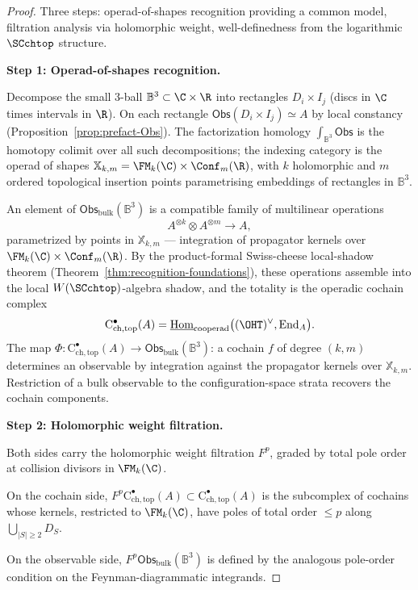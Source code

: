 \begin{proof}
Three steps: operad-of-shapes recognition providing a common model, filtration analysis via holomorphic weight, well-definedness from the logarithmic $\SCchtop$ structure.

\medskip
\textbf{Step 1: Operad-of-shapes recognition.}

Decompose the small $3$-ball $\mathbb{B}^3 \subset \C \times \R$ into rectangles $D_i \times I_j$ (discs in $\C$ times intervals in $\R$). On each rectangle $\mathsf{Obs}(D_i \times I_j) \simeq A$ by local constancy (Proposition~\ref{prop:prefact-Obs}). The factorization homology $\int_{\mathbb{B}^3} \mathsf{Obs}$ is the homotopy colimit over all such decompositions; the indexing category is the operad of shapes $\mathbb{X}_{k,m} = \FM_k(\C) \times \Conf_m(\R)$, with $k$ holomorphic and $m$ ordered topological insertion points parametrising embeddings of rectangles in $\mathbb{B}^3$.

An element of $\mathsf{Obs}_{\mathrm{bulk}}(\mathbb{B}^3)$ is a compatible family of multilinear operations
\[
A^{\otimes k} \otimes A^{\otimes m} \longrightarrow A,
\]
parametrized by points in $\mathbb{X}_{k,m}$ — integration of propagator kernels over $\FM_k(\C) \times \Conf_m(\R)$. By the product-formal Swiss-cheese local-shadow theorem (Theorem~\ref{thm:recognition-foundations}), these operations assemble into the local $W(\SCchtop)$-algebra shadow, and the totality is the operadic cochain complex
\[
\mathrm{C}^\bullet_{\mathrm{ch,top}}(A) = \underline{\mathrm{Hom}}_{\text{cooperad}}\bigl((\OHT)^\vee, \mathrm{End}_A\bigr).
\]
The map $\Phi \colon \mathrm{C}^\bullet_{\mathrm{ch,top}}(A) \to \mathsf{Obs}_{\mathrm{bulk}}(\mathbb{B}^3)$: a cochain $f$ of degree $(k,m)$ determines an observable by integration against the propagator kernels over $\mathbb{X}_{k,m}$. Restriction of a bulk observable to the configuration-space strata recovers the cochain components.

\medskip
\textbf{Step 2: Holomorphic weight filtration.}

Both sides carry the holomorphic weight filtration $F^p$, graded by total pole order at collision divisors in $\FM_k(\C)$.

On the cochain side, $F^p \mathrm{C}^\bullet_{\mathrm{ch,top}}(A) \subset \mathrm{C}^\bullet_{\mathrm{ch,top}}(A)$ is the subcomplex of cochains whose kernels, restricted to $\FM_k(\C)$, have poles of total order $\le p$ along $\bigcup_{|S| \geq 2} D_S$.

On the observable side, $F^p \mathsf{Obs}_{\mathrm{bulk}}(\mathbb{B}^3)$ is defined by the analogous pole-order condition on the Feynman-diagrammatic integrands.


\end{proof}
